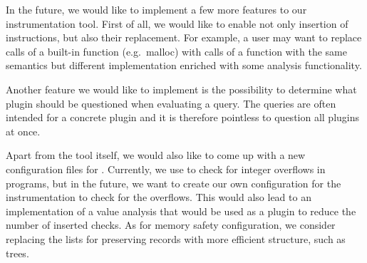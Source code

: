 In the future, we would like to implement a few more features to our
instrumentation tool. First of all, we would like to enable not only insertion
of instructions, but also their replacement. For example, a user may want to
replace calls of a built-in function (e.g.~malloc) with calls of a function
with the same semantics but different implementation enriched with some
analysis functionality.

Another feature we would like to implement is the possibility to determine
what plugin should be questioned when evaluating a query. The queries are often
intended for a concrete plugin and it is therefore pointless to question all
plugins at once.

Apart from the tool itself, we would also like to come up with a new
configuration files for \symbiotic. Currently, we use \clang to check for
integer overflows in programs, but in the future, we want to create our own
configuration for the instrumentation to check for the overflows. This would
also lead to an implementation of a value analysis that would be used as a
plugin to reduce the number of inserted checks.  As for memory safety
configuration, we consider replacing the lists for preserving records with more
efficient structure, such as trees.
